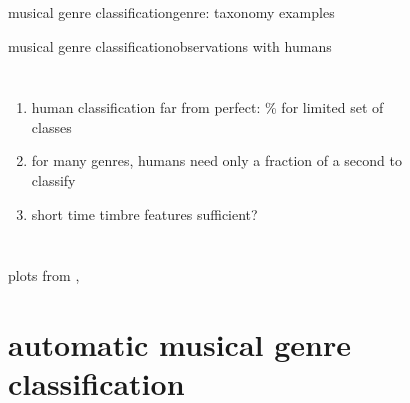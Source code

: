         \begin{frame}{musical genre classification}{genre: taxonomy examples}
                \vspace{-20mm}
                \begin{center}
                \scalebox{.7}
                {
                    
                }
                \end{center}
        \end{frame}

        \begin{frame}{musical genre classification}{observations with humans}
            \vspace{-3mm}
            \begin{columns}
                    \begin{enumerate}
                        \item   human classification far from perfect: \unit[75--90]{\%} for limited set of classes
                        \item<2-> for many genres, humans need only a fraction of a second to classify
                        \smallskip
                        \item<2->[$\Rightarrow$]	short time timbre features sufficient?
                    \end{enumerate}
                    \begin{figure}
                        \centering
                    \end{figure}
            \end{columns}
            \begin{flushright}plots from ,\end{flushright}
        \end{frame}
    
    \section[MGC]{automatic musical genre classification}

